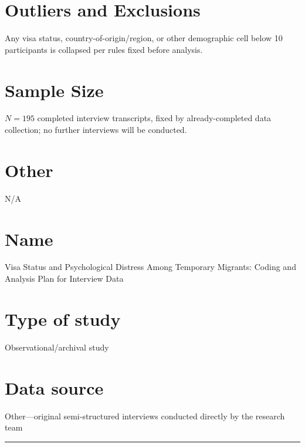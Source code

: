 \documentclass[12pt]{article}
\begin{document}
\section{Outliers and Exclusions}

Any visa status, country-of-origin/region, or other
demographic cell below 10 participants is collapsed per rules fixed before analysis.

\section{Sample Size}

$N = 195$ completed interview transcripts, fixed by already-completed
data collection; no further interviews will be conducted.
\section{Other}

N/A
\section{Name}

Visa Status and Psychological Distress Among Temporary Migrants: Coding and Analysis Plan for Interview Data

\section{Type of study}

Observational/archival study

\section{Data source}

Other---original semi-structured interviews conducted directly by the research team

\vspace{2em}
\noindent\rule{\linewidth}{0.4pt}

\vspace{0.5em}
\end{document}

